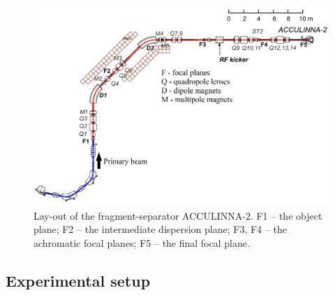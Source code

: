 \begin{figure}[t]
	\begin{center}
		\includegraphics[width=1\textwidth]{figures/acculinna2.png}
	\end{center}
	\caption{Lay-out of the fragment-separator ACCULINNA-2. F1 – the object plane; F2 – the intermediate dispersion plane; F3, F4 – the achromatic focal planes; F5 – the final focal plane.}
	\label{fig:acculinna2_scheme}
\end{figure}

\subsection{Experimental setup}


